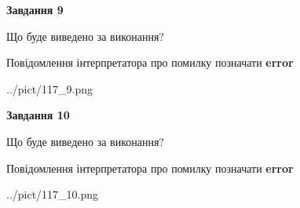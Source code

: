 \documentclass[12pt, ukrainian]{article}
\begin{document}
{{\begin {center}\textbf{Завдання 9}\end {center}}\par
Що буде виведено за виконання? \par
Повідомлення інтерпретатора про помилку позначати \textbf{error}

\begin{center}
	{../pict/117_9.png}
\end{center}
\newpage

{\begin {center}\textbf{Завдання 10}\end {center}}\par
Що буде виведено за виконання? \par
Повідомлення інтерпретатора про помилку позначати \textbf{error}

\begin{center}
	{../pict/117_10.png}
\end{center}
\newpage

}
\end{document}
